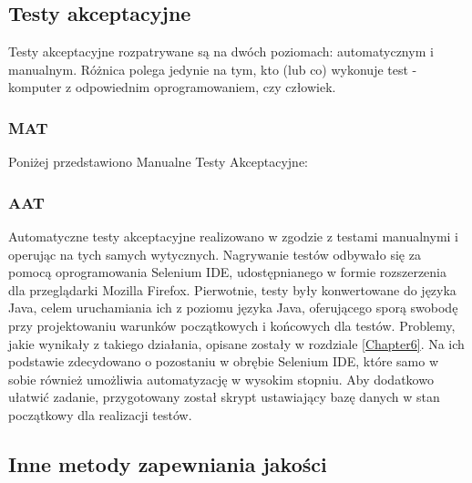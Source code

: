\subsection{Testy akceptacyjne}
\label{Chapter713}

Testy akceptacyjne rozpatrywane są na dwóch poziomach: automatycznym i manualnym. Różnica polega jedynie na tym, kto (lub co) wykonuje test - komputer z odpowiednim oprogramowaniem, czy człowiek.

\subsubsection{MAT}
\label{Chapter7131}

Poniżej przedstawiono Manualne Testy Akceptacyjne:

\matpres
{}
\matsteps
{}

\matpres
{}
\matsteps
{}

\subsubsection{AAT}
\label{Chapter7131}

Automatyczne testy akceptacyjne realizowano w zgodzie z testami manualnymi i operując na tych samych wytycznych. Nagrywanie testów odbywało się za pomocą oprogramowania Selenium IDE, udostępnianego w formie rozszerzenia dla przeglądarki Mozilla Firefox. Pierwotnie, testy były konwertowane do języka Java, celem uruchamiania ich z poziomu języka Java, oferującego sporą swobodę przy projektowaniu warunków początkowych i końcowych dla testów. Problemy, jakie wynikały z takiego działania, opisane zostały w rozdziale \ref{Chapter6}. Na ich podstawie zdecydowano o pozostaniu w obrębie Selenium IDE, które samo w sobie również umożliwia automatyzację w wysokim stopniu. Aby dodatkowo ułatwić zadanie, przygotowany został skrypt ustawiający bazę danych w stan początkowy dla realizacji testów.

\subsection{Inne metody zapewniania jakości}
\label{Chapter714}

